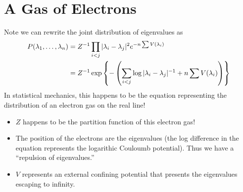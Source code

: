 \section{A Gas of Electrons}
Note we can rewrite the joint distribution of eigenvalues as
\[
    \begin{split}
        P(\lambda_1, \dots, \lambda_n) &= Z^{-1} \prod_{i < j} |\lambda_i-\lambda_j|^2e^{-n\sum V(\lambda_i)}\\
        &= Z^{-1} \exp\left\{- \left( \sum_{i < j} \log |\lambda_i-\lambda_j|^{-1} + n \sum V(\lambda_i) \right) \right\}\\
    \end{split}
\]
In statistical mechanics, this happens to be the equation representing the distribution of an electron gas on the real line!
\begin{itemize}
    \item $Z$ happens to be the partition function of this electron gas!
    \item The position of the electrons are the eigenvalues (the log difference in the equation represents the logarithic Couloumb potential). Thus we have a ``repulsion of eigenvalues.''
    \item $V$ represents an external confining potential that presents the eigenvalues escaping to infinity.
\end{itemize}

